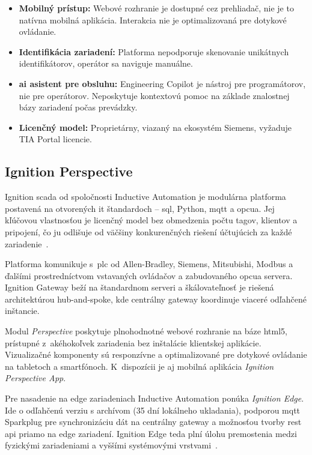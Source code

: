 \begin{itemize}
      \item \textbf{Mobilný prístup:} Webové rozhranie je dostupné cez prehliadač,
            nie je to natívna mobilná aplikácia. Interakcia nie je optimalizovaná
            pre dotykové ovládanie.
      \item \textbf{Identifikácia zariadení:} Platforma nepodporuje skenovanie
            unikátnych identifikátorov, operátor sa naviguje
            manuálne.
      \item \textbf{\acrshort{ai} asistent pre obsluhu:} Engineering Copilot je nástroj pre
            programátorov, nie pre operátorov. Neposkytuje kontextovú pomoc na základe
            znalostnej bázy zariadení počas prevádzky.
      \item \textbf{Licenčný model:} Proprietárny, viazaný na ekosystém Siemens,
            vyžaduje TIA Portal licencie.
\end{itemize}

\subsection{Ignition Perspective}

Ignition \acrshort{scada} od spoločnosti Inductive Automation je modulárna
platforma postavená na otvorených \acrshort{it} štandardoch -- \acrshort{sql},
Python, \acrshort{mqtt} a \acrshort{opcua}. Jej kľúčovou vlastnosťou je
licenčný model bez obmedzenia počtu tagov, klientov a pripojení, čo ju odlišuje
od väčšiny konkurenčných riešení účtujúcich za každé zariadenie~\cite{t02}.

Platforma komunikuje s~\acrshort{plc} od Allen-Bradley, Siemens, Mitsubishi,
Modbus a ďalšími prostredníctvom vstavaných ovládačov a zabudovaného
\acrshort{opcua} servera. Ignition Gateway beží na štandardnom serveri a
škálovateľnosť je riešená architektúrou hub-and-spoke, kde centrálny gateway
koordinuje viaceré odľahčené inštancie.

Modul \textit{Perspective} poskytuje plnohodnotné webové rozhranie na báze
\acrshort{html}5, prístupné z~akéhokoľvek zariadenia bez inštalácie klientskej
aplikácie. Vizualizačné komponenty sú responzívne a optimalizované pre dotykové
ovládanie na tabletoch a smartfónoch. K~dispozícii je aj mobilná aplikácia
\textit{Ignition Perspective App}.

Pre nasadenie na edge zariadeniach Inductive Automation ponúka \textit{Ignition
      Edge}. Ide o odľahčenú verziu s archívom (35 dní lokálneho ukladania), podporou
\acrshort{mqtt} Sparkplug pre synchronizáciu dát na centrálny gateway a
možnosťou tvorby \acrshort{rest} \acrshort{api} priamo na edge zariadení.
Ignition Edge teda plní úlohu premostenia medzi fyzickými
zariadeniami a vyššími systémovými vrstvami~\cite{t03}.

